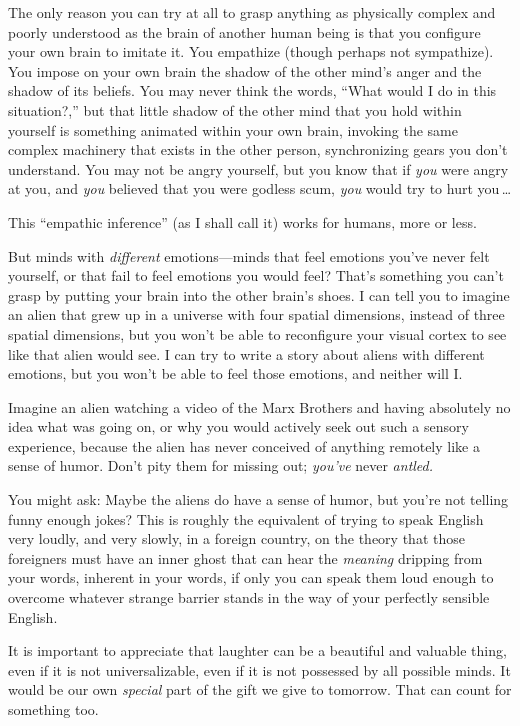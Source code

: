  The only reason you can try at all to grasp anything as physically
complex and poorly understood as the brain of another human being is
that you configure your own brain to imitate it. You empathize (though
perhaps not sympathize). You impose on your own brain the shadow of the
other mind's anger and the shadow of its beliefs. You
may never think the words, ``What would I do in this
situation?,'' but that little shadow of the other
mind that you hold within yourself is something animated within your
own brain, invoking the same complex machinery that exists in the other
person, synchronizing gears you don't understand. You
may not be angry yourself, but you know that if \textit{you} were angry
at you, and \textit{you} believed that you were godless scum,
\textit{you} would try to hurt you\,\ldots


 This ``empathic inference'' (as
I shall call it) works for humans, more or less.


 But minds with \textit{different} emotions---minds that feel
emotions you've never felt yourself, or that fail to
feel emotions you would feel? That's something you
can't grasp by putting your brain into the other
brain's shoes. I can tell you to imagine an alien that
grew up in a universe with four spatial dimensions, instead of three
spatial dimensions, but you won't be able to
reconfigure your visual cortex to see like that alien would see. I can
try to write a story about aliens with different emotions, but you
won't be able to feel those emotions, and neither will
I.


 Imagine an alien watching a video of the Marx Brothers and having
absolutely no idea what was going on, or why you would actively seek
out such a sensory experience, because the alien has never conceived of
anything remotely like a sense of humor. Don't pity
them for missing out; \textit{you've} never
\textit{antled.}


 You might ask: Maybe the aliens do have a sense of humor, but
you're not telling funny enough jokes? This is roughly
the equivalent of trying to speak English very loudly, and very slowly,
in a foreign country, on the theory that those foreigners must have an
inner ghost that can hear the \textit{meaning} dripping from your
words, inherent in your words, if only you can speak them loud enough
to overcome whatever strange barrier stands in the way of your
perfectly sensible English.


 It is important to appreciate that laughter can be a beautiful and
valuable thing, even if it is not universalizable, even if it is not
possessed by all possible minds. It would be our own \textit{special}
part of the gift we give to tomorrow. That can count for something
too.


